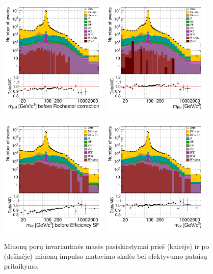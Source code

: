 \documentclass[a4paper, 12pt, oneside]{article}
\begin{document}
\begin{figure}[t!]
	\RawFloats
	\includegraphics[width=0.48\textwidth]{Magistrinis/mumu_mass_before.png}
	\includegraphics[width=0.48\textwidth]{Magistrinis/mumu_mass_after.png}
	\vspace{-0.6cm}
	\caption{\label{fig:invMba_mumu} Miuonų porų invariantinės masės pasiskirstymai prieš (kairėje) ir po (dešinėje)
	miuonų impulso matavimo skalės bei efektyvumo pataisų pritaikymo.}
	\includegraphics[width=0.48\textwidth]{Magistrinis/ee_mass_before.png}
	\includegraphics[width=0.48\textwidth]{Magistrinis/ee_mass_after.png}

\end{figure}
\end{document}
